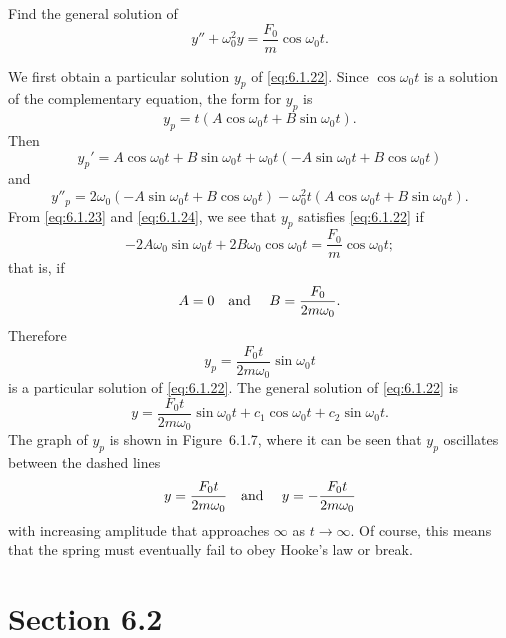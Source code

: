 \setcounter{example}{4}
\setcounter{equation}{21}
\begin{example}
  \label{example:6.1.5}\rm Find the general solution of
  \begin{equation}
    \label{eq:6.1.22}y''+\omega_{0}^{2}y=\frac{F_{0}}{m}\cos\omega_{0}t.
  \end{equation}
\end{example}
\setcounter{equation}{22}
\begin{examplesolution}
\solution We first obtain a particular solution $y_{p}$ of \eqref{eq:6.1.22}. Since
$\cos\omega_{0}t$ is a solution of the complementary equation, the form for $y_{p}$ is
\begin{equation}
  \label{eq:6.1.23}y_{p}=t(A\cos\omega_{0}t+B\sin\omega_{0}t).
\end{equation}
Then
\[
  y_{p}'=A\cos\omega_{0}t+B\sin\omega_{0}t +\omega_{0}t(-A\sin\omega_{0}t+B\cos\omega_{0}t)
\]
and
\begin{equation}
  \label{eq:6.1.24}y''_{p}=2\omega_{0}(-A\sin\omega_{0}t +B\cos\omega_{0}t)-\omega_{0}^{2}t(A\cos\omega_{0}t+B\sin\omega_{0}t).
\end{equation}
From \eqref{eq:6.1.23} and \eqref{eq:6.1.24}, we see that $y_{p}$ satisfies \eqref{eq:6.1.22} if
\[
  -2A\omega_{0}\sin\omega_{0}t+2B\omega_{0}\cos\omega_{0}t=\frac{F_{0}}{m}\cos\omega_{0}t;
\]
that is, if
\[
  A=0\mbox{\quad and \quad}B=\frac{F_{0}}{2m\omega_{0}}.
\]
Therefore
\[
  y_{p}=\frac{F_{0}t}{2m\omega_{0}}\sin\omega_{0}t
\]
is a particular solution of \eqref{eq:6.1.22}. The general solution of \eqref{eq:6.1.22} is
\[
  y=\frac{F_{0}t}{2m\omega_{0}}\sin\omega_{0}t+c_{1}\cos\omega_{0}t+c_{2}\sin\omega_{0}t.
\]
The graph of $y_{p}$ is shown in Figure~6.1.7, where it can be seen that $y_{p}$
oscillates between the dashed lines
\[
  y=\frac{F_{0}t}{2m\omega_{0}}\mbox{\quad and \quad}y=-\frac{F_{0}t}{2m\omega_{0}}
\]
with increasing amplitude that approaches $\infty$ as $t\to\infty$. Of course, this means that the
spring must eventually fail to obey Hooke's law or break.\bbox
\end{examplesolution}

\section*{Section 6.2}
\setcounter{chapter}{6}
\setcounter{section}{2}

